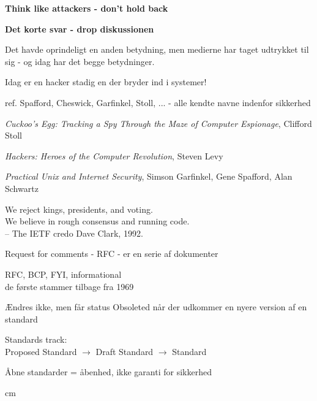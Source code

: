 \documentclass[Screen16to9,17pt]{foils}
\begin{document}
{\bf Think like attackers - don't hold back}



{\bfseries Det korte svar - drop diskussionen}

Det havde oprindeligt en anden betydning, men medierne har taget
udtrykket til sig - og idag har det begge betydninger.

{\color{red}\hlkbig Idag er en hacker stadig en der bryder ind i systemer!}

ref. Spafford, Cheswick, Garfinkel, Stoll, ...
- alle kendte navne indenfor sikkerhed


\begin{list2}
\item \emph{Cuckoo's Egg: Tracking a Spy Through the Maze of Computer
 Espionage},  Clifford Stoll
\item \emph{Hackers: Heroes of the Computer Revolution},
Steven Levy
\item \emph{Practical Unix and Internet Security},
Simson Garfinkel, Gene Spafford, Alan Schwartz
\end{list2}


{\hlkbig
We reject kings, presidents, and voting.\\
We believe in rough consensus and running code.\\
-- The IETF credo Dave Clark, 1992.}

\begin{list1}
\item Request for comments - RFC - er en serie af dokumenter
\item RFC, BCP, FYI, informational\\
de første stammer tilbage fra 1969
\item Ændres ikke, men får status Obsoleted når der udkommer en nyere
  version af en standard
\item Standards track:\\
Proposed Standard $\rightarrow$ Draft Standard $\rightarrow$ Standard
\item  Åbne standarder = åbenhed, ikke garanti for sikkerhed
\end{list1}





 cm
\end{document}
